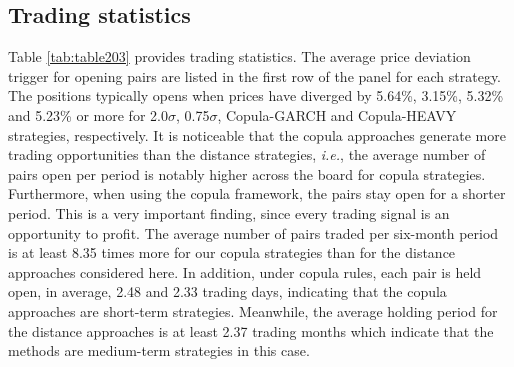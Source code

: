 \documentclass[a4paper,12pt]{report}
\begin{document}
\vspace{0.3cm}

\subsection{Trading statistics}

Table \ref{tab:table203} provides trading statistics. The average price deviation trigger for opening pairs are listed in the first row of the panel for each strategy. The positions typically opens when prices have diverged by 5.64\%, 3.15\%, 5.32\% and 5.23\% or more for 2.0$\sigma$, 0.75$\sigma$, Copula-GARCH and Copula-HEAVY strategies, respectively. It is noticeable that the copula approaches generate more trading opportunities than the distance strategies, \emph{i.e.}, the average number of pairs open per period is notably higher across the board for copula strategies. Furthermore, when using the copula framework, the pairs stay open for a shorter period. This is a very important finding, since every trading signal is an opportunity to profit. The average number of pairs traded per six-month period is at least 8.35 times more for our copula strategies than for the distance approaches considered here. In addition, under copula rules, each pair is held open, in average, 2.48 and 2.33 trading days, indicating that the copula approaches are short-term strategies. Meanwhile, the average holding period for the distance approaches is at least 2.37 trading months which indicate that the methods are medium-term strategies in this case.
\end{document}
